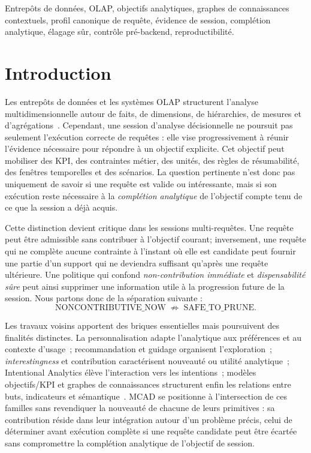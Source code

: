\documentclass[journal]{IEEEtran}
\begin{document}
\begin{IEEEkeywords}
Entrepôts de données, OLAP, objectifs analytiques, graphes de connaissances contextuels, profil canonique de requête, évidence de session, complétion analytique, élagage sûr, contrôle pré-backend, reproductibilité.
\end{IEEEkeywords}

\section{Introduction}
\label{sec:intro}

Les entrepôts de données et les systèmes OLAP structurent l'analyse multidimensionnelle autour de faits, de dimensions, de hiérarchies, de mesures et d'agrégations~\cite{ChaudhuriDayal97,KimballRoss2013,ChenBI2012}. Cependant, une session d'analyse décisionnelle ne poursuit pas seulement l'exécution correcte de requêtes : elle vise progressivement à réunir l'évidence nécessaire pour répondre à un objectif explicite. Cet objectif peut mobiliser des KPI, des contraintes métier, des unités, des règles de résumabilité, des fenêtres temporelles et des scénarios. La question pertinente n'est donc pas uniquement de savoir si une requête est valide ou intéressante, mais si son exécution reste nécessaire à la \emph{complétion analytique} de l'objectif compte tenu de ce que la session a déjà acquis.

Cette distinction devient critique dans les sessions multi-requêtes. Une requête peut être admissible sans contribuer à l'objectif courant; inversement, une requête qui ne complète aucune contrainte à l'instant où elle est candidate peut fournir une partie d'un support qui ne deviendra suffisant qu'après une requête ultérieure. Une politique qui confond \emph{non-contribution immédiate} et \emph{dispensabilité sûre} peut ainsi supprimer une information utile à la progression future de la session. Nous partons donc de la séparation suivante :
\[
\text{NONCONTRIBUTIVE\_NOW} \;\not\Rightarrow\; \text{SAFE\_TO\_PRUNE}.
\]

Les travaux voisins apportent des briques essentielles mais poursuivent des finalités distinctes. La personnalisation adapte l'analytique aux préférences et au contexte d'usage~\cite{GolfarelliRizziBiondi2011,JacobGunklachMaedche2025}; recommandation et guidage organisent l'exploration~\cite{AligonDSS2015,GunklachNadj2023}; \emph{interestingness} et contribution caractérisent nouveauté ou utilité analytique~\cite{DjedainiEtAl2019,GkitsakisEtAl2024}; Intentional Analytics élève l'interaction vers les intentions~\cite{VassiliadisMarcelRizzi2019}; modèles objectifs/KPI et graphes de connaissances structurent enfin les relations entre buts, indicateurs et sémantique~\cite{Pourshahid2014,MateTrujilloMylopoulos2017,HoganKGSurvey2021}. MCAD se positionne à l'intersection de ces familles sans revendiquer la nouveauté de chacune de leurs primitives : sa contribution réside dans leur intégration autour d'un problème précis, celui de déterminer avant exécution complète si une requête candidate peut être écartée sans compromettre la complétion analytique de l'objectif de session.
\end{document}
